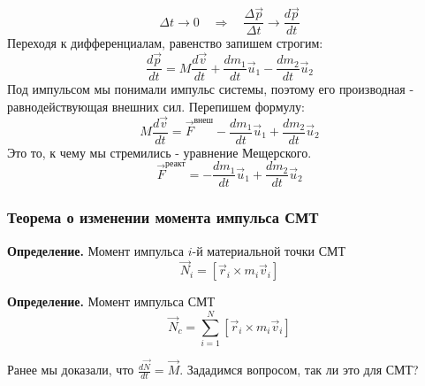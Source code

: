 \documentclass[a4paper,12pt]{extarticle}
\begin{document}
\begin{equation}
	\Delta t \to 0 \quad \Rightarrow \quad \frac{\Delta{\vec{p}}}{\Delta{t}}\to \frac{d\vec{p}}{dt}
\end{equation}
Переходя к дифференциалам, равенство запишем строгим:
\begin{equation}
	\frac{d\vec{p}}{dt}= M\frac{d\vec{v}}{dt}+\frac{dm_1}{dt}\vec{u}_1-\frac{dm_2}{dt}\vec{u}_2
\end{equation}
Под импульсом мы понимали импульс системы, поэтому его производная - равнодействующая внешних сил. Перепишем формулу:
\begin{equation}
	M\frac{d\vec{v}}{dt}=\vec{F}^\text{внеш}-\frac{dm_1}{dt}\vec{u}_1+\frac{dm_2}{dt}\vec{u}_2
\end{equation}
Это то, к чему мы стремились - уравнение Мещерского.
\begin{equation}
	\vec{F}^\text{реакт}=-\frac{dm_1}{dt}\vec{u}_1+\frac{dm_2}{dt}\vec{u}_2
\end{equation}

\subsubsection{Теорема о изменении момента импульса СМТ}

\textbf{Определение.} Момент импульса $i$-й материальной точки СМТ
\begin{equation}
	\vec{N}_i=[\vec{r}_i\times m_i\vec{v}_i]
\end{equation}

\textbf{Определение.} Момент импульса СМТ
\begin{equation}
	\vec{N}_c=\sum_{i=1}^{N}[\vec{r}_i\times m_i\vec{v}_i]
\end{equation}    

Ранее мы доказали, что $\frac{d\vec{N}}{dt}=\vec{M}$. Зададимся вопросом, так ли это для СМТ?
\end{document}
